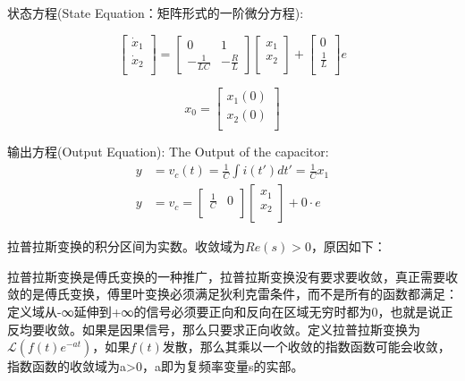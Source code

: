 \documentclass[main.tex]{subfiles}
\begin{document}
状态方程(State Equation：矩阵形式的一阶微分方程):

\begin{equation}
    \begin{bmatrix}
    \dot x_1 \\
    \dot x_2 \\
    \end{bmatrix}
    =
    \begin{bmatrix}
        0 & 1 \\
        -\frac{1}{LC} & -\frac{R}{L}
    \end{bmatrix}
    \begin{bmatrix}
        x_1 \\
        x_2 \\
    \end{bmatrix}
    +
    \begin{bmatrix}
        0\\
        \frac{1}{L}\\
    \end{bmatrix}
    e
\end{equation}

\begin{equation}
    x_0 = 
    \begin{bmatrix}
        x_1(0) \\
        x_2(0) \\
    \end{bmatrix}
\end{equation}

输出方程(Output Equation):
The Output of the capacitor:
\begin{equation}
    \begin{aligned}
    y &= v_c(t) = \frac{1}{C} \int i(t')dt' = \frac{1}{C}x_1 \\
    y &= v_c = 
    \begin{bmatrix}
        \frac{1}{C} & 0\\
    \end{bmatrix}
    \begin{bmatrix}
        x_1 \\
        x_2 \\
    \end{bmatrix}
    + 0\cdot e
    \end{aligned}
\end{equation}

拉普拉斯变换的积分区间为实数。收敛域为$Re(s) > 0$，原因如下：

拉普拉斯变换是傅氏变换的一种推广，拉普拉斯变换没有要求要收敛，真正需要收敛的是傅氏变换，傅里叶变换必须满足狄利克雷条件，而不是所有的函数都满足：定义域从-∞延伸到+∞的信号必须要正向和反向在区域无穷时都为0，也就是说正反均要收敛。如果是因果信号，那么只要求正向收敛。定义拉普拉斯变换为$\mathcal{L}(f(t)e^{-at})$，如果$f(t)$发散，那么其乘以一个收敛的指数函数可能会收敛，指数函数的收敛域为a>0，a即为复频率变量s的实部。
\end{document}
